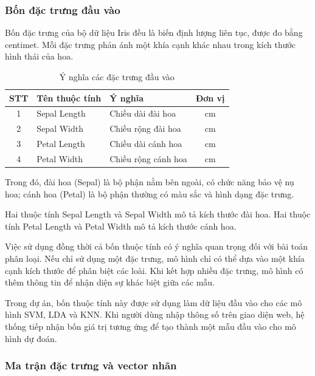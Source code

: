 \documentclass[14pt]{extarticle}
\begin{document}
	\subsubsection{Bốn đặc trưng đầu vào}
	
		\noindent Bốn đặc trưng của bộ dữ liệu Iris đều là biến định lượng liên tục, được đo bằng centimet. Mỗi đặc trưng phản ánh một khía cạnh khác nhau trong kích thước hình thái của hoa.
	
	\begin{table}[htbp]
		\centering
		\caption{Ý nghĩa các đặc trưng đầu vào}
		\label{tab:iris-features}
		\begin{tabular}{|c|l|l|c|}
			\hline
			\textbf{STT} & \textbf{Tên thuộc tính} & \textbf{Ý nghĩa} & \textbf{Đơn vị} \\
			\hline
			1 & Sepal Length & Chiều dài đài hoa & cm \\
			\hline
			2 & Sepal Width & Chiều rộng đài hoa & cm \\
			\hline
			3 & Petal Length & Chiều dài cánh hoa & cm \\
			\hline
			4 & Petal Width & Chiều rộng cánh hoa & cm \\
			\hline
		\end{tabular}
	\end{table}
	
	Trong đó, đài hoa (Sepal) là bộ phận nằm bên ngoài, có chức năng bảo vệ nụ hoa; cánh hoa (Petal) là bộ phận thường có màu sắc và hình dạng đặc trưng.
	
	Hai thuộc tính Sepal Length và Sepal Width mô tả kích thước đài hoa. Hai thuộc tính Petal Length và Petal Width mô tả kích thước cánh hoa.
	
	Việc sử dụng đồng thời cả bốn thuộc tính có ý nghĩa quan trọng đối với bài toán phân loại. Nếu chỉ sử dụng một đặc trưng, mô hình chỉ có thể dựa vào một khía cạnh kích thước để phân biệt các loài. Khi kết hợp nhiều đặc trưng, mô hình có thêm thông tin để nhận diện sự khác biệt giữa các mẫu.
	
	Trong dự án, bốn thuộc tính này được sử dụng làm dữ liệu đầu vào cho các mô hình SVM, LDA và KNN. Khi người dùng nhập thông số trên giao diện web, hệ thống tiếp nhận bốn giá trị tương ứng để tạo thành một mẫu đầu vào cho mô hình dự đoán.
	
	\subsubsection{Ma trận đặc trưng và vector nhãn}
	
\end{document}
